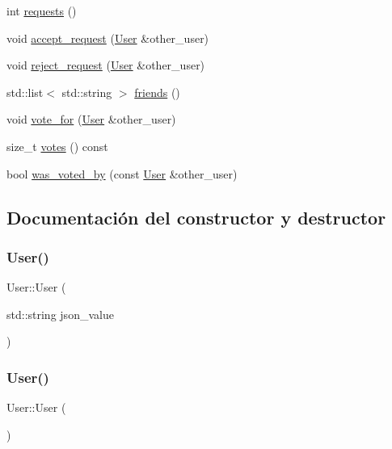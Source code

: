 \begin{DoxyCompactItemize}
int \hyperlink{classUser_aa165982b75d55551626758b6fffac803}{requests} ()
\item 
void \hyperlink{classUser_aecb82a4b3775064eb10fcdaf288fbfa4}{accept\+\_\+request} (\hyperlink{classUser}{User} \&other\+\_\+user)
\item 
void \hyperlink{classUser_a6b431d3face2db990dcdf48d74e745d6}{reject\+\_\+request} (\hyperlink{classUser}{User} \&other\+\_\+user)
\item 
std\+::list$<$ std\+::string $>$ \hyperlink{classUser_a4d4864c9959ed4db8c1e92ab924f0d76}{friends} ()
\item 
void \hyperlink{classUser_ae7bca2cb41eac8d576a781ac2de1b150}{vote\+\_\+for} (\hyperlink{classUser}{User} \&other\+\_\+user)
\item 
size\+\_\+t \hyperlink{classUser_a0b8e3871b4c9623b37dcfed43ddee1b3}{votes} () const
\item 
bool \hyperlink{classUser_a29b6fe2813703559ecb60f2f5614302f}{was\+\_\+voted\+\_\+by} (const \hyperlink{classUser}{User} \&other\+\_\+user)
\end{DoxyCompactItemize}


\subsection{Documentación del constructor y destructor}
\mbox{\label{classUser_a39b6626888c80680166832d96a8ac4c7}} 
\subsubsection{\texorpdfstring{User()}{User()}\hspace{0.1cm}{\footnotesize\ttfamily [1/2]}}
{\footnotesize\ttfamily User\+::\+User (\begin{DoxyParamCaption}\item[{std\+::string}]{json\+\_\+value }\end{DoxyParamCaption})}

\mbox{\label{classUser_a4a0137053e591fbb79d9057dd7d2283d}} 
\subsubsection{\texorpdfstring{User()}{User()}\hspace{0.1cm}{\footnotesize\ttfamily [2/2]}}
{\footnotesize\ttfamily User\+::\+User (\begin{DoxyParamCaption}{ }\end{DoxyParamCaption})}

